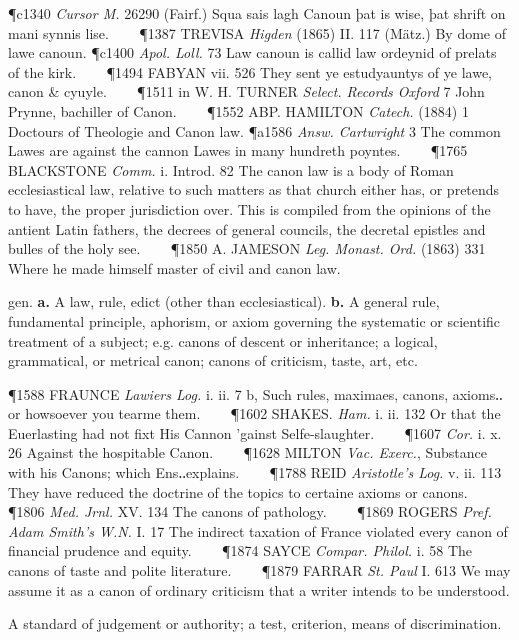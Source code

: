 \begin{description}[wide, labelwidth=!, labelindent=0pt]
\begin{myenumerate}
\P c1340  \textit{Cursor M.} 26290 (Fairf.) Squa sais lagh Canoun þat is wise, þat shrift on mani synnis lise.    
\P 1387 TREVISA  \textit{Higden} (1865) II. 117 (Mätz.) By dome of lawe canoun.
\P c1400 \textit{Apol.  Loll.} 73 Law canoun is callid law ordeynid of prelats of the kirk.    
\P 1494 FABYAN  vii. 526 They sent ye estudyauntys of ye lawe, canon \& cyuyle.    
\P 1511 in W. H. TURNER  \textit{Select. Records Oxford} 7 John Prynne, bachiller of Canon.    
\P 1552 ABP. HAMILTON  \textit{Catech.} (1884) 1 Doctours of Theologie and Canon law.
\P a1586 \textit{Answ.  Cartwright} 3 The common Lawes are against the cannon Lawes in many hundreth poyntes.    
\P 1765 BLACKSTONE  \textit{Comm.} i. Introd. 82 The canon law is a body of Roman ecclesiastical law, relative to such matters as that church either has, or pretends to have, the proper jurisdiction over. This is compiled from the opinions of the antient Latin fathers, the decrees of general councils, the decretal epistles and bulles of the holy see.    
\P 1850 A. JAMESON  \textit{Leg. Monast. Ord.} (1863) 331 Where he made himself master of civil and canon law.

 gen. \textbf{a.} A law, rule, edict (other than ecclesiastical). \textbf{b.} A general rule, fundamental principle, aphorism, or axiom governing the systematic or scientific treatment of a subject; e.g. canons of descent or inheritance; a logical, grammatical, or metrical canon; canons of criticism, taste, art, etc.

\P 1588 FRAUNCE  \textit{Lawiers Log.} i. ii. 7 b, Such rules, maximaes, canons, axioms‥or howsoever you tearme them.    
\P 1602 SHAKES.  \textit{Ham.} i. ii. 132 Or that the Euerlasting had not fixt His Cannon 'gainst Selfe-slaughter.    
\P 1607 \textit{Cor.} i. x. 26 Against the hospitable Canon.    
\P 1628 MILTON  \textit{Vac. Exerc.}, Substance with his Canons; which Ens‥explains.    
\P 1788 REID  \textit{Aristotle's Log.} v. ii. 113 They have reduced the doctrine of the topics to certaine axioms or canons.    
\P 1806 \textit{Med. Jrnl.} XV. 134 The canons of pathology.    
\P 1869 ROGERS  \textit{Pref. Adam Smith's W.N.} I. 17 The indirect taxation of France violated every canon of financial prudence and equity.    
\P 1874 SAYCE  \textit{Compar. Philol.} i. 58 The canons of taste and polite literature.    
\P 1879 FARRAR  \textit{St. Paul} I. 613 We may assume it as a canon of ordinary criticism that a writer intends to be understood.

 A standard of judgement or authority; a test, criterion, means of discrimination.


\end{myenumerate}
\end{description}
